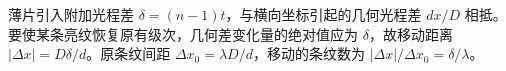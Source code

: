 薄片引入附加光程差 $\delta=(n-1)t$，与横向坐标引起的几何光程差 $dx/D$ 相抵。要使某条亮纹恢复原有级次，几何差变化量的绝对值应为 $\delta$，故移动距离 $|\Delta x|=D\delta/d$。原条纹间距 $\Delta x_0=\lambda D/d$，移动的条纹数为 $|\Delta x|/\Delta x_0=\delta/\lambda$。
